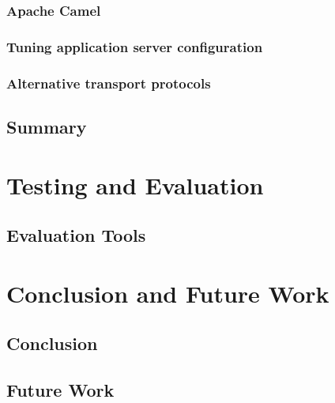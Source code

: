 \documentclass[USenglish]{ifimaster}
\begin{document}
\subsection{Apache Camel}

\subsection{Tuning application server configuration}

\subsection{Alternative transport protocols}

\section{Summary}

\chapter{Testing and Evaluation}
\section{Evaluation Tools}

\chapter{Conclusion and Future Work}
\section{Conclusion}

\section{Future Work}

\pagebreak
\printbibliography{}
\printglossary
\end{document}
